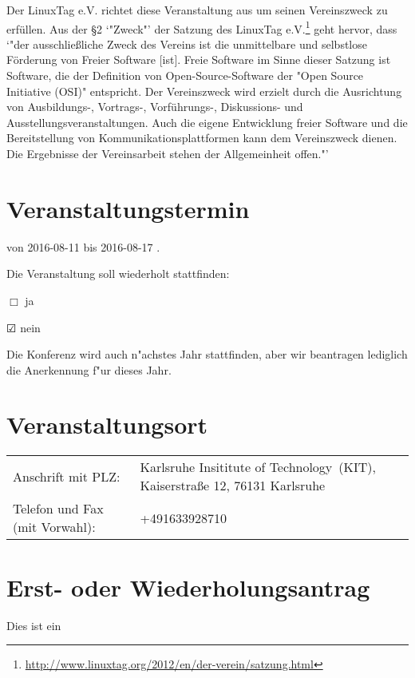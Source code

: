 \documentclass{scrartcl}
\begin{document}
    
      Der LinuxTag e.V. richtet diese Veranstaltung aus um seinen 
      Vereinszweck zu erfüllen.
      Aus der §2 `"Zweck"' der Satzung des LinuxTag e.V.\footnote{\url{http://www.linuxtag.org/2012/en/der-verein/satzung.html}}
      geht hervor, dass
      `"der ausschließliche Zweck des Vereins ist die unmittelbare und selbstlose Förderung von Freier Software [ist].
      Freie Software im Sinne dieser Satzung ist Software, die der Definition von Open-Source-Software der "Open Source Initiative (OSI)" entspricht.
      Der Vereinszweck wird erzielt durch die Ausrichtung von Ausbildungs-, Vortrags-, Vorführungs-, Diskussions- und Ausstellungsveranstaltungen. Auch die eigene Entwicklung freier Software und die Bereitstellung von Kommunikationsplattformen kann dem Vereinszweck dienen. Die Ergebnisse der Vereinsarbeit stehen der Allgemeinheit offen."'



\section{Veranstaltungstermin}

von
\hspace{5em}
%
2016-08-11
%
\hspace{5em}
bis
\hspace{5em}
%
2016-08-17\xspace
.

Die Veranstaltung soll wiederholt stattfinden:

$\Box$
ja

$\CheckedBox$
nein

Die Konferenz wird auch n"achstes Jahr stattfinden,
aber wir beantragen lediglich die Anerkennung f"ur dieses Jahr.

\section{Veranstaltungsort}
\begin{tabu} to  0.95\textwidth { X X[2] }
Anschrift mit PLZ:               &
    Karlsruhe Insititute of Technology~(KIT), Kaiserstraße 12, 76131 Karlsruhe
    \\
Telefon und Fax (mit Vorwahl):   &
    +491633928710\\
\end{tabu}



\section{Erst- oder Wiederholungsantrag}
Dies ist ein
\end{document}
